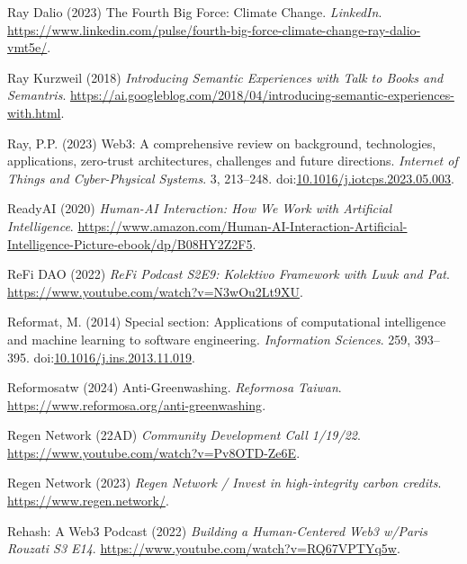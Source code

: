 \documentclass[
  letterpaper,
  DIV=11,
  numbers=noendperiod]{scrartcl}
\newlength{\cslhangindent}
\newenvironment{CSLReferences}[2] %
 {\begin{list}{}{%
  \setlength{\itemindent}{0pt}
  \setlength{\leftmargin}{0pt}
  \setlength{\parsep}{0pt}
  \ifodd #1
   \setlength{\leftmargin}{\cslhangindent}
   \setlength{\itemindent}{-1\cslhangindent}
  \fi
  \setlength{\itemsep}{#2\baselineskip}}}
 {\end{list}}
\begin{document}
\begin{CSLReferences}{0}{1}
Ray Dalio (2023) The {Fourth Big Force}: {Climate Change}.
\emph{LinkedIn}.
\url{https://www.linkedin.com/pulse/fourth-big-force-climate-change-ray-dalio-vmt5e/}.

Ray Kurzweil (2018) \emph{Introducing {Semantic Experiences} with {Talk}
to {Books} and {Semantris}}.
\url{https://ai.googleblog.com/2018/04/introducing-semantic-experiences-with.html}.

Ray, P.P. (2023) Web3: {A} comprehensive review on background,
technologies, applications, zero-trust architectures, challenges and
future directions. \emph{Internet of Things and Cyber-Physical Systems}.
3, 213--248.
doi:\href{https://doi.org/10.1016/j.iotcps.2023.05.003}{10.1016/j.iotcps.2023.05.003}.

ReadyAI (2020) \emph{Human-{AI Interaction}: {How We Work} with
{Artificial Intelligence}}.
\url{https://www.amazon.com/Human-AI-Interaction-Artificial-Intelligence-Picture-ebook/dp/B08HY2Z2F5}.

ReFi DAO (2022) \emph{{ReFi Podcast S2E9}: {Kolektivo Framework} with
{Luuk} and {Pat}}. \url{https://www.youtube.com/watch?v=N3wOu2Lt9XU}.

Reformat, M. (2014) Special section: {Applications} of computational
intelligence and machine learning to software engineering.
\emph{Information Sciences}. 259, 393--395.
doi:\href{https://doi.org/10.1016/j.ins.2013.11.019}{10.1016/j.ins.2013.11.019}.

Reformosatw (2024) Anti-{Greenwashing}. \emph{Reformosa Taiwan}.
\url{https://www.reformosa.org/anti-greenwashing}.

Regen Network (22AD) \emph{Community {Development Call} 1/19/22}.
\url{https://www.youtube.com/watch?v=Pv8OTD-Ze6E}.

Regen Network (2023) \emph{Regen {Network} / {Invest} in high-integrity
carbon credits}. \url{https://www.regen.network/}.

Rehash: A Web3 Podcast (2022) \emph{Building a {Human-Centered Web3}
w/{Paris Rouzati} {\textbar} {S3 E14}}.
\url{https://www.youtube.com/watch?v=RQ67VPTYq5w}.


\end{CSLReferences}
\end{document}
